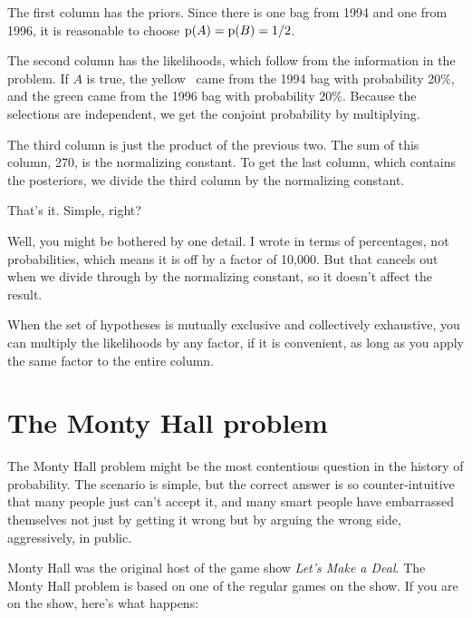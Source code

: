 \documentclass[12pt]{book}
\begin{document}
The first column has the priors.
Since there is one bag from 1994 and one from 1996,
it is reasonable to choose $\mathrm{p}(A) = \mathrm{p}(B) = 1/2$.

The second column has the likelihoods, which follow from the
information in the problem.  If $A$ is true, the yellow \MM~came from
the 1994 bag with probability 20\%, and the green came from the 1996
bag with probability 20\%.  Because the selections are independent, we
get the conjoint probability by multiplying.

The third column is just the product of the previous two.
The sum of this column, 270, is the normalizing constant.
To get the last column, which contains the posteriors, we divide
the third column by the normalizing constant.

That's it.  Simple, right?

Well, you might be bothered by one detail.  I wrote 
in terms of percentages, not probabilities, which means it
is off by a factor of 10,000.  But that
cancels out when we divide through by the normalizing constant, so
it doesn't affect the result.

When the set of hypotheses is mutually exclusive and collectively
exhaustive, you can multiply the likelihoods by any factor, if it is
convenient, as long as you apply the same factor to the entire column.


\section{The Monty Hall problem}

The Monty Hall problem might be the most contentious question in
the history of probability.  The scenario is simple, but the correct
answer is so counter-intuitive that many people just can't accept
it, and many smart people have embarrassed themselves not just by
getting it wrong but by arguing the wrong side, aggressively,
in public.

Monty Hall was the original host of the game show {\em Let's Make a
Deal}.  The Monty Hall problem is based on one of the regular
games on the show.  If you are on the show, here's what happens:
\end{document}
